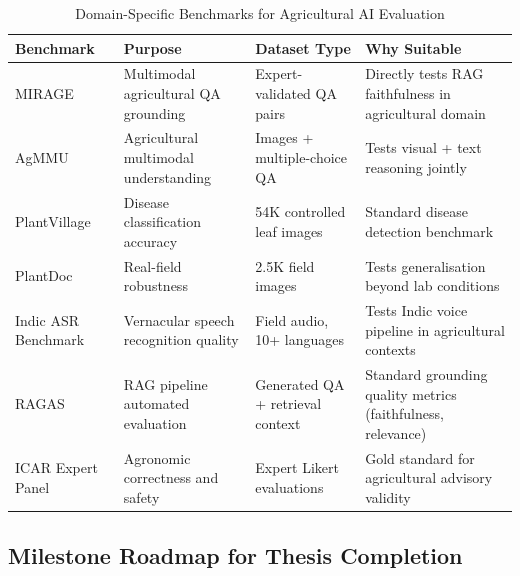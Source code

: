 \documentclass[12pt,a4paper]{article}
\begin{document}
\begin{table}[htbp]
\centering
\small
\setlength{\tabcolsep}{3.5pt}
\renewcommand{\arraystretch}{1.08}
\caption{Domain-Specific Benchmarks for Agricultural AI Evaluation}
\label{tab:benchmarks}
\begin{tabularx}{\textwidth}{|>{\raggedright\arraybackslash}p{2.9cm}|>{\raggedright\arraybackslash}X|>{\raggedright\arraybackslash}p{2.85cm}|>{\raggedright\arraybackslash}X|}
\hline
\textbf{Benchmark} & \textbf{Purpose} & \textbf{Dataset Type} & \textbf{Why Suitable} \\
\hline
MIRAGE~\cite{mirage2025} & Multimodal agricultural QA grounding & Expert-validated QA pairs & Directly tests RAG faithfulness in agricultural domain \\
\hline
AgMMU~\cite{agmmu2025} & Agricultural multimodal understanding & Images + multiple-choice QA & Tests visual + text reasoning jointly \\
\hline
PlantVillage~\cite{plantvillage2019} & Disease classification accuracy & 54K controlled leaf images & Standard disease detection benchmark \\
\hline
PlantDoc~\cite{plantdoc2020} & Real-field robustness & 2.5K field images & Tests generalisation beyond lab conditions \\
\hline
Indic ASR Benchmark~\cite{indicasr2025} & Vernacular speech recognition quality & Field audio, 10+ languages & Tests Indic voice pipeline in agricultural contexts \\
\hline
RAGAS~\cite{ragas2023} & RAG pipeline automated evaluation & Generated QA + retrieval context & Standard grounding quality metrics (faithfulness, relevance) \\
\hline
ICAR Expert Panel & Agronomic correctness and safety & Expert Likert evaluations & Gold standard for agricultural advisory validity \\
\hline
\end{tabularx}
\end{table}

\clearpage
\subsection{Milestone Roadmap for Thesis Completion}
\end{document}
